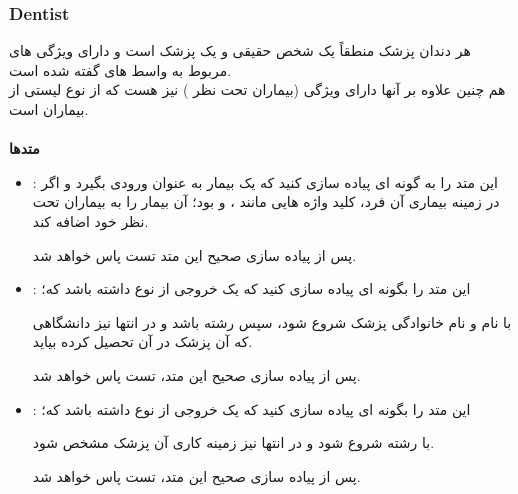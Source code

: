         \subsubsection{Dentist}
        هر دندان پزشک منطقاً یک شخص حقیقی و یک پزشک است و دارای ویژگی های مربوط به 
        واسط های گفته شده
        است.
        \\
        هم چنین علاوه بر آنها دارای ویژگی 
        (بیماران تحت نظر )
        نیز هست که از نوع لیستی از بیماران است.
        \\
        \\
        \textbf{متدها}
        \begin{itemize}
        \item 
            \grayBox{\textcolor{orange}{Acceptable}}
            :
            این متد
            را به گونه ای پیاده سازی کنید که یک بیمار به عنوان ورودی بگیرد و اگر در زمینه بیماری آن فرد، 
            کلید واژه هایی مانند 
            \grayBox{\textcolor{red}{Toothache}}
            ،
            \grayBox{\textcolor{red}{Teeth}}
            و
            \grayBox{\textcolor{red}{Dental}}
            بود؛ آن بیمار را به بیماران تحت نظر خود اضافه کند.
            
            پس از پیاده سازی صحیح این متد تست
            \grayBox{\textcolor{dkgreen}{AddingPatientsToDentist}}
            پاس خواهد شد.

        \item
            \grayBox{\textcolor{orange}{GraduatedFrom}}
            :
            این متد را بگونه ای پیاده سازی کنید که یک خروجی از نوع 
            \grayBox{\textcolor{blue}{string}}
            داشته باشد که؛
            
            با نام و نام خانوادگی پزشک شروع شود، سپس رشته 
            باشد و در انتها نیز دانشگاهی که آن پزشک در آن تحصیل کرده بیاید.
            
            پس از پیاده سازی صحیح این متد، تست
            \grayBox{\textcolor{dkgreen}{GraduatingDentists}}
            پاس خواهد شد.
            
        \item
            \grayBox{\textcolor{orange}{Work}}
            :
            این متد را بگونه ای پیاده سازی کنید که یک خروجی از نوع 
            \grayBox{\textcolor{blue}{string}}
            داشته باشد که؛
            
            با رشته
            شروع شود و در انتها نیز زمینه کاری آن پزشک مشخص شود.
            
            پس از پیاده سازی صحیح این متد، تست
            \grayBox{\textcolor{dkgreen}{WorkingDentists}}
            پاس خواهد شد.
        \end{itemize}
        
